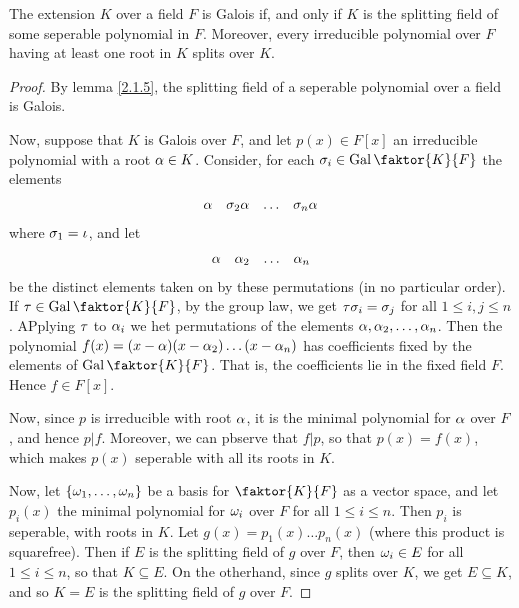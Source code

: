 \begin{theorem}\label{2.2.3}
    The extension $K$ over a field  $F$ is Galois if, and only if $K$ is the
    splitting field of some seperable polynomial in $F$. Moreover, every
    irreducible polynomial over $F$ having at least one root in  $K$ splits over
     $K$.
\end{theorem}
\begin{proof}
    By lemma \ref{2.1.5}, the splitting field of a seperable polynomial over a
    field is Galois.

    Now, suppose that $K$ is Galois over  $F$, and let  $p(x) \in F[x]$ an
    irreducible polynomial with a root $\alpha \in K$. Consider, for each  $\s_i \in
    \Gal{\faktor{K}{F}}$ the elements
    \begin{align*}
        \alpha  &&   \sigma_2\alpha  &&   \dots   &&   \sigma_n\alpha  \\
    \end{align*}
    where $\sigma_1=\iota$, and let
    \begin{align*}
        \alpha  &&   \alpha_2  &&   \dots   &&   \alpha_n  \\
    \end{align*}
    be the distinct elements taken on by these permutations (in no particular
    order). If $\t \in \Gal{\faktor{K}{F}}$, by the group law, we get
    $\tau\sigma_i=\sigma_j$ for all  $1 \leq i,j \leq n$. APplying  $\tau$ to  $\alpha_i$ we
    het permutations of the elements  $\alpha, \alpha_2, \dots, \alpha_n$. Then the
    polynomial $f(x)=(x-\alpha)(x-\alpha_2) \dots (x-\alpha_n)$ has coefficients fixed by
    the elements of $\Gal{\faktor{K}{F}}$. That is, the coefficients lie in the
    fixed field $F$. Hence  $f \in F[x]$.

    Now, since $p$ is irreducible with root $\alpha$, it is the minimal polynomial
    for $\alpha$ over $F$, and hence  $p|f$. Moreover, we can pbserve that $f|p$, so
    that  $p(x)=f(x)$, which makes  $p(x)$ seperable with all its roots in  $K$.

    Now, let $\{\omega_1, \dots, \omega_n\}$ be a basis for $\faktor{K}{F}$ as a vector
    space, and let $p_i(x)$ the minimal polynomial for $\omega_i$ over $F$ for all
    $1 \leq i \leq n$. Then  $p_i$ is seperable, with roots in  $K$. Let
    $g(x)=p_1(x) \dots p_n(x)$ (where this product is squarefree). Then if $E$
    is the splitting field of  $g$ over  $F$, then $\omega_i \in E$ for all  $1 \leq
    i \leq n$, so that  $K \subseteq E$. On the otherhand, since  $g$ splits
    over  $K$, we get  $E \subseteq K$, and so  $K=E$ is the splitting field of
     $g$ over $F$.
\end{proof}

